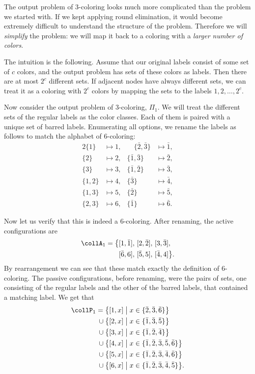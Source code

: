The output problem of 3-coloring looks much more complicated than the problem we started with. If we kept applying round elimination, it would become extremely difficult to understand the structure of the problem. Therefore we will \emph{simplify} the problem: we will map it back to a coloring with a \emph{larger number of colors}.

The intuition is the following. Assume that our original labels consist of some set of $c$ colors, and the output problem has sets of these colors as labels. Then there are at most $2^c$ different sets. If adjacent nodes have always different sets, we can treat it as a coloring with $2^c$ colors by mapping the sets to the labels $1,2,\dots, 2^c$.

Now consider the output problem of 3-coloring, $\Pi_1$. We will treat the different sets of the regular labels as the color classes. Each of them is paired with a unique set of barred labels. Enumerating all options, we rename the labels as follows to match the alphabet of $6$-coloring:
\begingroup
\allowdisplaybreaks
\begin{alignat*}{2}
	\{ 1 \} &\mapsto 1, & \quad\{\bar{2},\bar{3} \} &\mapsto \bar{1}, \\
	\{ 2 \} &\mapsto 2, & \{\bar{1},\bar{3} \} &\mapsto \bar{2}, \\
	\{ 3 \} &\mapsto 3, & \{\bar{1},\bar{2} \} &\mapsto \bar{3}, \\
	\{ 1,2 \} &\mapsto 4, & \{\bar{3}\} &\mapsto \bar{4}, \\
	\{ 1,3 \} &\mapsto 5, & \{ \bar{2} \} &\mapsto \bar{5}, \\
	\{ 2,3 \} &\mapsto 6, & \{ \bar{1} \} &\mapsto \bar{6}.
\end{alignat*}
\endgroup

Now let us verify that this is indeed a 6-coloring. After renaming, the active configurations are
\begin{align*}
	\collA_1 = \bigl\{& 
	[1,\bar{1}],\,
	[2,\bar{2}],\,
	[3,\bar{3}],\, \\
	&[\bar{6},6],\,
	[\bar{5},5],\,
	[\bar{4},4] 
	\bigr\}.
\end{align*}
By rearrangement we can see that these match exactly the definition of $6$-coloring. The passive configurations, before renaming, were the pairs of sets, one consisting of the regular labels and the other of the barred labels, that contained a matching label. We get that 
\begin{align*}
	\collP_1
	      = {}&\bigl\{ [1, x] \bigm| x \in \{ \bar{2}, \bar{3}, \bar{6} \} \bigr\} \\
	{} \cup {}&\bigl\{ [2, x] \bigm| x \in \{ \bar{1}, \bar{3}, \bar{5} \} \bigr\} \\
	{} \cup {}&\bigl\{ [3, x] \bigm| x \in \{ \bar{1}, \bar{2}, \bar{4} \} \bigr\} \\
	{} \cup {}&\bigl\{ [4, x] \bigm| x \in \{ \bar{1}, \bar{2}, \bar{3}, \bar{5}, \bar{6} \} \bigr\} \\
	{} \cup {}&\bigl\{ [5, x] \bigm| x \in \{ \bar{1}, \bar{2}, \bar{3}, \bar{4}, \bar{6} \} \bigr\} \\
	{} \cup {}&\bigl\{ [6, x] \bigm| x \in \{ \bar{1}, \bar{2}, \bar{3}, \bar{4}, \bar{5} \} \bigr\}.
\end{align*}

